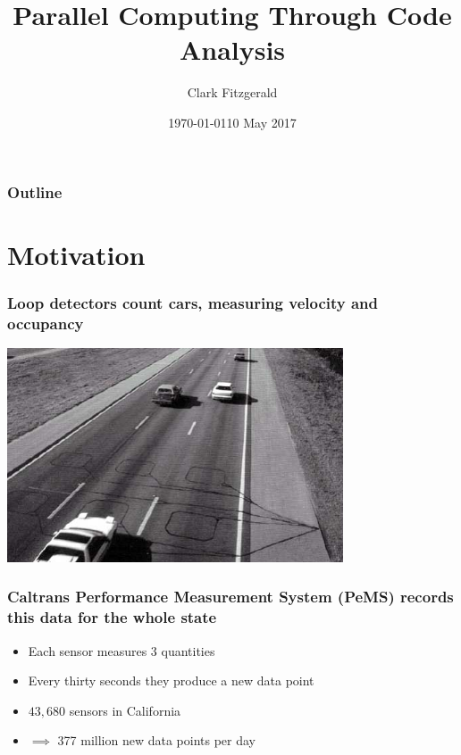 \documentclass{beamer}
\begin{document}
\title{Parallel Computing Through Code Analysis}
\date{\today}
\date{10 May 2017}
\author{Clark Fitzgerald}

\frame{\titlepage}

\begin{frame}
    \frametitle{Outline}
    \tableofcontents
\end{frame}

\section{Motivation}
\begin{frame}

    \frametitle{Loop detectors count cars, measuring velocity and
    occupancy}

\centerline{\includegraphics[height=2.5in]{loop_detector.jpg}}

\end{frame}
\begin{frame}

\frametitle{Caltrans Performance Measurement System (PeMS) records this
data for the whole state}

    \begin{itemize}
        \item Each sensor measures 3 quantities
        \item Every thirty seconds they produce a new data point
        \item $43,680$ sensors in California
        \item $\implies$  377 million new data points per day
    \end{itemize}

\end{frame}
\end{document}
